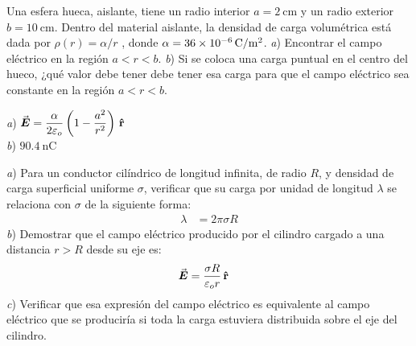 %
\begin{Exercise}
  \textbf{} Una esfera hueca, aislante, tiene un radio interior $a = \SI{2}{\centi\metre}$ y un radio exterior $b = \SI{10}{\centi\metre}$. Dentro del material aislante, la densidad de carga volumétrica está dada por $\rho(r) = \alpha/ r$ , donde $\alpha = \SI{36E-6}{\coulomb/\metre\squared}$. \textit{a}) Encontrar el campo eléctrico en la región $a < r < b$. \textit{b}) Si se coloca una carga puntual en el centro del hueco, ¿qué valor debe tener debe tener esa carga para que el campo eléctrico sea constante en la región $a < r < b$.
\end{Exercise}
\begin{Answer}
  \begin{minipage}[t]{.4\textwidth}
    \textit{a}) $\va*{E} = \dfrac{\alpha}{2\varepsilon_o}\left (1 - \dfrac{a^2}{r^2} \right )\,\vu{r}$\\ \textit{b}) $\SI{90.4}{\nano\coulomb}$
  \end{minipage}
\end{Answer}
%
\begin{Exercise}
  \textbf{} \textit{a}) Para un conductor cilíndrico de longitud infinita, de radio $R$, y densidad de carga superficial uniforme $\sigma$, verificar que su carga por unidad de longitud $\lambda$ se relaciona con $\sigma$ de la siguiente forma:
  \begin{align*}
    \lambda &= 2\pi\sigma R
  \end{align*}
  \textit{b}) Demostrar que el campo eléctrico producido por el cilindro cargado a una distancia $r > R$ desde su eje es:
  \begin{align*}
    \va*{E} &= \frac{\sigma R}{\varepsilon_o r}\,\vu{r}
  \end{align*}
  \textit{c}) Verificar que esa expresión del campo eléctrico es equivalente al campo eléctrico que se produciría si toda la carga estuviera distribuida sobre el eje del cilindro.
\end{Exercise}
%
